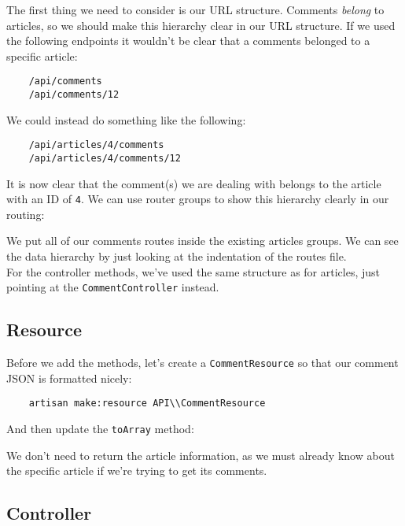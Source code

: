 The first thing we need to consider is our URL structure. Comments \textit{belong} to articles, so we should make this hierarchy clear in our URL structure. If we used the following endpoints it wouldn't be clear that a comments belonged to a specific article:

\begin{verbatim}
    /api/comments
    /api/comments/12
\end{verbatim}

We could instead do something like the following:

\begin{verbatim}
    /api/articles/4/comments
    /api/articles/4/comments/12
\end{verbatim}

It is now clear that the comment(s) we are dealing with belongs to the article with an ID of \texttt{4}. We can use router groups to show this hierarchy clearly in our routing:


We put all of our comments routes inside the existing articles groups. We can see the data hierarchy by just looking at the indentation of the routes file.
\\

For the controller methods, we've used the same structure as for articles, just pointing at the \texttt{CommentController} instead.


\subsection{Resource}

Before we add the methods, let's create a \texttt{CommentResource} so that our comment JSON is formatted nicely:

\begin{verbatim}
    artisan make:resource API\\CommentResource
\end{verbatim}

And then update the \texttt{toArray} method:


We don't need to return the article information, as we must already know about the specific article if we're trying to get its comments.

\subsection{Controller}

